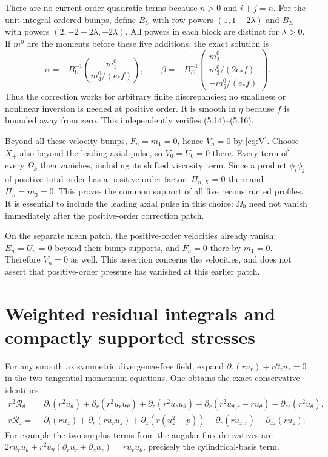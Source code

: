 \documentclass[10pt,a4paper]{article}
\newcommand{\res}{\mathcal R}
\begin{document}
There are no current-order quadratic terms because $n>0$ and $i+j=n$.
For the unit-integral ordered bumps, define $B_U$ with row powers
$(1,1-2\lambda)$ and $B_E$ with powers $(2,-2-2\lambda,-2\lambda)$.
All powers in each block are distinct for $\lambda>0$. If $m^0$ are the
moments before these five additions, the exact solution is
\[
\alpha=-B_U^{-1}\binom{m_1^0}{m_4^0/(e_*f)},\qquad
\beta=-B_E^{-1}\begin{pmatrix}m_2^0\\m_3^0/(2e_*f)\\-m_5^0/(e_*f)\end{pmatrix}.
\]
Thus the correction works for arbitrary finite discrepancies; no smallness or
nonlinear inversion is needed at positive order. It is smooth in $\eta$ because
$f$ is bounded away from zero. This independently verifies (5.14)--(5.16).

Beyond all these velocity bumps, $F_n=m_1=0$, hence $V_n=0$ by
\eqref{eq:V}. Choose $X_+$ also beyond the leading axial pulse, so $V_0=U_0=0$
there. Every term of every $\Omega_k$ then vanishes, including its shifted
viscosity term. Since a product $\phi_i\phi_j$ of positive total order has a
positive-order factor, $\Pi_{n,X}=0$ there and $\Pi_n=m_3=0$.
This proves the common support of all five reconstructed profiles. It is essential
to include the leading axial pulse in this choice: $\Omega_0$ need not vanish
immediately after the positive-order correction patch.

On the separate mean patch, the positive-order velocities already vanish:
$E_n=U_n=0$ beyond their bump supports, and $F_n=0$ there by $m_1=0$.
Therefore $V_n=0$ as well. This assertion concerns the velocities, and does not
assert that positive-order pressure has vanished at this earlier patch.

\section{Weighted residual integrals and compactly supported stresses}
For any smooth axisymmetric divergence-free field, expand
$\partial_r(ru_r)+r\partial_zu_z=0$ in the two tangential momentum equations.
One obtains the exact conservative identities
\begin{align*}
r^2\res_\theta={}&\partial_t(r^2u_\theta)+\partial_r(r^2u_ru_\theta)
+\partial_z(r^2u_zu_\theta)-\partial_r(r^2u_{\theta,r}-ru_\theta)
-\partial_{zz}(r^2u_\theta),\\
r\res_z={}&\partial_t(ru_z)+\partial_r(ru_ru_z)
+\partial_z(r(u_z^2+p))-\partial_r(ru_{z,r})-\partial_{zz}(ru_z).
\end{align*}
For example the two surplus terms from the angular flux derivatives are
$2ru_ru_\theta+r^2u_\theta(\partial_ru_r+\partial_zu_z)
=ru_ru_\theta$, precisely the cylindrical-basis term.
\end{document}

